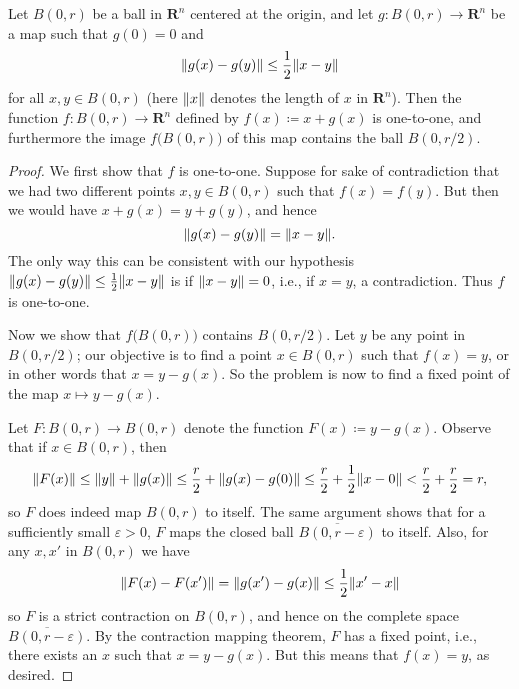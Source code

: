 \begin{lemma}\label{6.6.6}
    Let \(B(0, r)\) be a ball in \(\mathbf{R}^n\) centered at the origin, and let \(g : B(0, r) \to \mathbf{R}^n\) be a map such that \(g(0) = 0\) and
    \[
        \norm*{g(x) - g(y)} \leq \frac{1}{2} \norm*{x - y}
    \]
    for all \(x, y \in B(0, r)\)
    (here \(\norm*{x}\) denotes the length of \(x\) in \(\mathbf{R}^n\)).
    Then the function \(f : B(0, r) \to \mathbf{R}^n\) defined by \(f(x) \coloneqq x + g(x)\) is one-to-one, and furthermore the image \(f\big(B(0, r)\big)\) of this map contains the ball \(B(0, r / 2)\).
\end{lemma}

\begin{proof}
    We first show that \(f\) is one-to-one.
    Suppose for sake of contradiction that we had two different points \(x, y \in B(0, r)\) such that \(f(x) = f(y)\).
    But then we would have \(x + g(x) = y + g(y)\), and hence
    \[
        \norm*{g(x) - g(y)} = \norm*{x - y}.
    \]
    The only way this can be consistent with our hypothesis \(\norm*{g(x) - g(y)} \leq \frac{1}{2} \norm*{x - y}\) is if \(\norm*{x - y} = 0\), i.e., if \(x = y\), a contradiction.
    Thus \(f\) is one-to-one.

    Now we show that \(f\big(B(0, r)\big)\) contains \(B(0, r / 2)\).
    Let \(y\) be any point in \(B(0, r / 2)\);
    our objective is to find a point \(x \in B(0, r)\) such that \(f(x) = y\), or in other words that \(x = y - g(x)\).
    So the problem is now to find a fixed point of the map \(x \mapsto y - g(x)\).

    Let \(F : B(0, r) \to B(0, r)\) denote the function \(F(x) \coloneqq y - g(x)\).
    Observe that if \(x \in B(0, r)\), then
    \[
        \norm*{F(x)} \leq \norm*{y} + \norm*{g(x)} \leq \frac{r}{2} + \norm*{g(x) - g(0)} \leq \frac{r}{2} + \frac{1}{2} \norm*{x - 0} < \frac{r}{2} + \frac{r}{2} = r,
    \]
    so \(F\) does indeed map \(B(0, r)\) to itself.
    The same argument shows that for a sufficiently small \(\varepsilon > 0\), \(F\) maps the closed ball \(\overline{B(0, r - \varepsilon)}\) to itself.
    Also, for any \(x, x'\) in \(B(0, r)\) we have
    \[
        \norm*{F(x) - F(x')} = \norm*{g(x') - g(x)} \leq \frac{1}{2} \norm*{x' - x}
    \]
    so \(F\) is a strict contraction on \(B(0, r)\), and hence on the complete space \(\overline{B(0, r - \varepsilon)}\).
    By the contraction mapping theorem, \(F\) has a fixed point, i.e., there exists an \(x\) such that \(x = y - g(x)\).
    But this means that \(f(x) = y\), as desired.
\end{proof}

